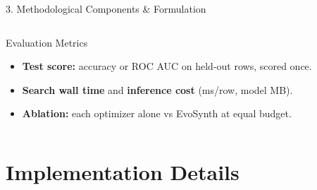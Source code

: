 \documentclass[aspectratio=169, 11pt]{beamer}
\begin{document}
\begin{frame}{3. Methodological Components \& Formulation}
\begin{columns}[T]
        \begin{block}{Evaluation Metrics}
            \scriptsize
            \begin{itemize}
                \setlength{\itemsep}{1pt}
                \item \textbf{Test score:} accuracy or ROC AUC on held-out rows, scored once.
                \item \textbf{Search wall time} and \textbf{inference cost} (ms/row, model MB).
                \item \textbf{Ablation:} each optimizer alone vs EvoSynth at equal budget.
            \end{itemize}
        \end{block}
    \end{columns}
\end{frame}

\section{Implementation Details}
\end{document}
